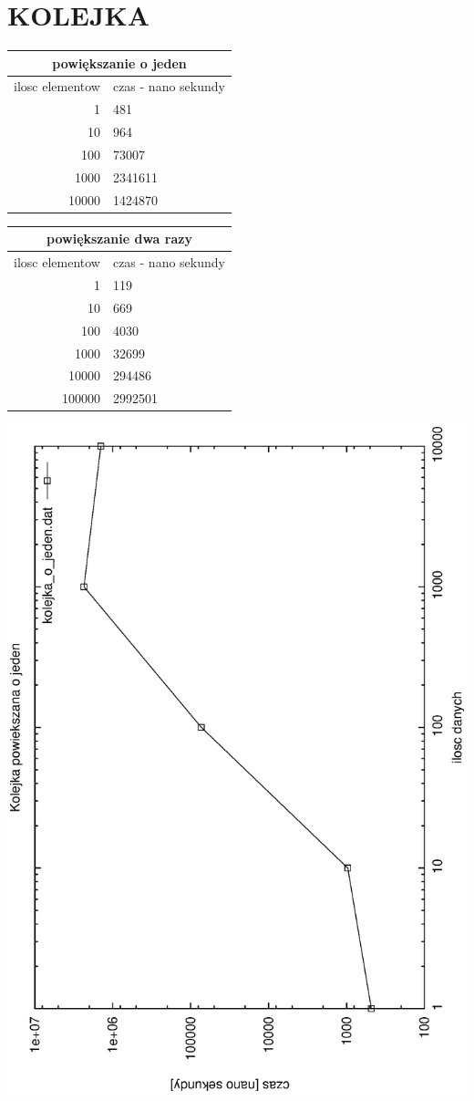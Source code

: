 \documentclass[a4paper,11pt]{report}
\begin{document}
\section{KOLEJKA}
\begin{tabular}{|rl|}
\hline
\multicolumn{2}{|c|}{powiększanie o jeden}\\
\hline
ilosc elementow & czas - nano sekundy\\
\hline
1&481\\
10&964\\
100&73007\\
1000&2341611\\
10000&1424870\\
\hline
\end{tabular}
\newline
\newline
\begin{tabular}{|rl|}
\hline
\multicolumn{2}{|c|}{powiększanie dwa razy}\\
\hline
ilosc elementow & czas - nano sekundy\\
\hline
1&119\\
10&669\\
100&4030\\
1000&32699\\
10000&294486\\
100000&2992501\\
\hline
\end{tabular}
\newline
\newline
\includegraphics[scale=0.55, angle=270]{wykresy/kolejka_o_jeden.eps}
\end{document}
